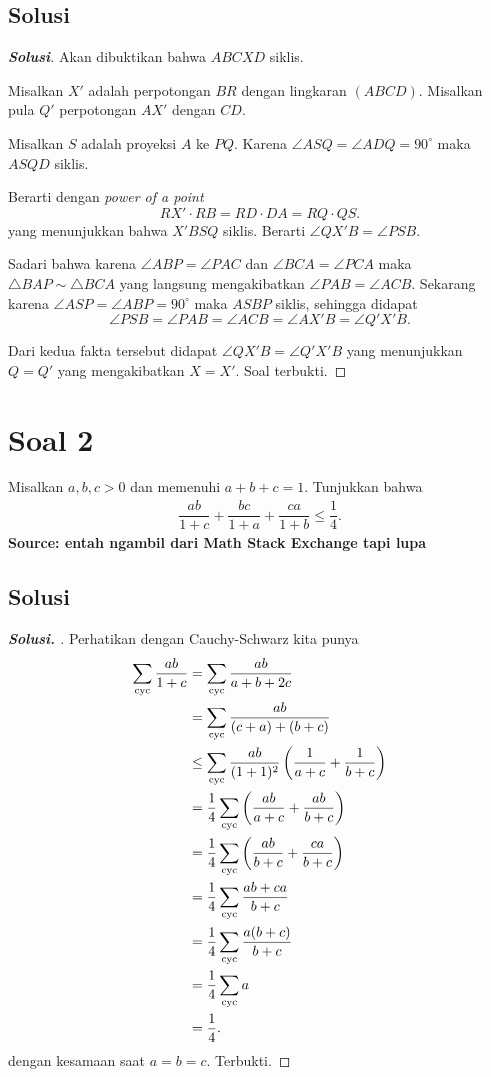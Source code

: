 \documentclass[11pt]{scrartcl}
\begin{document}
\subsection{Solusi}
\begin{proof}[\textbf{Solusi}]
Akan dibuktikan bahwa $ABCXD$ siklis. 

Misalkan $X'$ adalah perpotongan $BR$ dengan lingkaran $(ABCD)$. Misalkan pula $Q'$ perpotongan $AX'$ dengan $CD$.

Misalkan $S$ adalah proyeksi $A$ ke $PQ$. Karena $\angle ASQ = \angle ADQ = 90^\circ$ maka $ASQD$ siklis.

Berarti dengan \textit{power of a point}
$$RX'\cdot RB = RD\cdot DA = RQ\cdot QS.$$
yang menunjukkan bahwa $X'BSQ$ siklis. Berarti $\angle QX'B = \angle PSB$.

Sadari bahwa karena $\angle ABP = \angle PAC$ dan $\angle BCA = \angle PCA$ maka $\triangle BAP \sim \triangle BCA$ yang langsung mengakibatkan $\angle PAB = \angle ACB$.
Sekarang karena $\angle ASP = \angle ABP = 90^\circ$ maka $ASBP$ siklis, sehingga didapat $$\angle PSB = \angle PAB = \angle ACB = \angle AX'B = \angle Q'X'B.$$

Dari kedua fakta tersebut didapat $\angle QX'B = \angle Q'X'B$ yang menunjukkan $Q = Q'$ yang mengakibatkan $X = X'$. Soal terbukti.
\end{proof}

\newpage
\section{Soal 2} Misalkan $a,b,c > 0$ dan memenuhi $a+b+c=1$. Tunjukkan bahwa
\begin{align*}
\dfrac{ab}{1+c}+\dfrac{bc}{1+a}+\dfrac{ca}{1+b} \le \dfrac{1}{4}.
\end{align*}
\newline
\textbf{Source: entah ngambil dari Math Stack Exchange tapi lupa}
\subsection{Solusi}
\begin{proof}[\textbf{Solusi. }]
    Perhatikan dengan Cauchy-Schwarz kita punya
    \begin{align*}
        \sum_{\mathrm{cyc}} \dfrac{ab}{1+c} &= \sum_{\mathrm{cyc}} \dfrac{ab}{a+b+2c}\\
        &= \sum_{\mathrm{cyc}} \dfrac{ab}{(c+a)+(b+c)}\\
        &\le \sum_{\mathrm{cyc}} \dfrac{ab}{(1+1)^2}\left(\dfrac{1}{a+c} + \dfrac{1}{b+c}\right)\\
        &= \dfrac{1}{4} \sum_{\mathrm{cyc}} \left(\dfrac{ab}{a+c} + \dfrac{ab}{b+c}\right)\\
        &= \dfrac{1}{4}\sum_{\mathrm{cyc}} \left(\dfrac{ab}{b+c}+\dfrac{ca}{b+c}\right)\\
        &= \dfrac{1}{4}\sum_{\mathrm{cyc}} \dfrac{ab+ca}{b+c}\\
        &= \dfrac{1}{4}\sum_{\mathrm{cyc}} \dfrac{a(b+c)}{b+c}\\
        &= \dfrac{1}{4}\sum_{\mathrm{cyc}} a\\
        &= \dfrac{1}{4}.
    \end{align*}
    dengan kesamaan saat $a=b=c$. Terbukti.
\end{proof}
\end{document}
